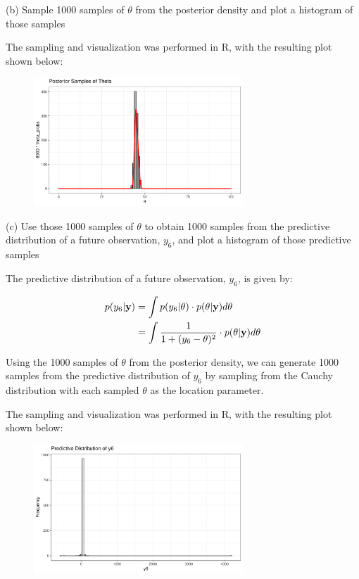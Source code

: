\documentclass[12pt]{article}
\def\by{{\rm {\bf{y}}}}
\begin{document}
(b) Sample 1000 samples of $\theta$ from the posterior density and plot a histogram of those samples

The sampling and visualization was performed in R, with the resulting plot shown below:

\begin{figure}[h]
    \centering
    \includegraphics[width=0.7\textwidth]{q4b_plot.pdf}
\end{figure}

\pagebreak

(c) Use those 1000 samples of $\theta$ to obtain 1000 samples from the predictive distribution of a future observation, $y_6$, and plot a histogram of those predictive samples

The predictive distribution of a future observation, $y_6$, is given by:

\begin{align*}
p(y_6 | \by) &= \int p(y_6 | \theta) \cdot p(\theta | \by) d\theta \\
&= \int \frac{1}{1 + (y_6 - \theta)^2} \cdot p(\theta | \by) d\theta \\
\end{align*}

Using the 1000 samples of $\theta$ from the posterior density, we can generate 1000 samples from the predictive distribution of $y_6$ by sampling from the Cauchy distribution with each sampled $\theta$ as the location parameter.

The sampling and visualization was performed in R, with the resulting plot shown below:

\begin{figure}[h]
    \centering
    \includegraphics[width=0.7\textwidth]{q4c_plot.pdf}
\end{figure}
\end{document}
